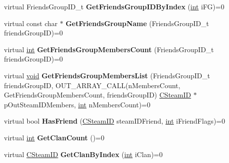 \begin{DoxyCompactItemize}
\item 
\hypertarget{classISteamFriends_a1a6e422dac40f8f15242a6a45c752d2f}{}virtual Friends\+Group\+I\+D\+\_\+t {\bfseries Get\+Friends\+Group\+I\+D\+By\+Index} (\hyperlink{SDL__thread_8h_a6a64f9be4433e4de6e2f2f548cf3c08e}{int} i\+F\+G)=0\label{classISteamFriends_a1a6e422dac40f8f15242a6a45c752d2f}

\item 
\hypertarget{classISteamFriends_a54c2657d4d5e27f47069e64aaeda2f53}{}virtual const char $\ast$ {\bfseries Get\+Friends\+Group\+Name} (Friends\+Group\+I\+D\+\_\+t friends\+Group\+I\+D)=0\label{classISteamFriends_a54c2657d4d5e27f47069e64aaeda2f53}

\item 
\hypertarget{classISteamFriends_a6fe9e93a63c5d8007eec7c65482ad397}{}virtual \hyperlink{SDL__thread_8h_a6a64f9be4433e4de6e2f2f548cf3c08e}{int} {\bfseries Get\+Friends\+Group\+Members\+Count} (Friends\+Group\+I\+D\+\_\+t friends\+Group\+I\+D)=0\label{classISteamFriends_a6fe9e93a63c5d8007eec7c65482ad397}

\item 
\hypertarget{classISteamFriends_af941cfe1efee3d4ddd639fa65d640a4d}{}virtual \hyperlink{SDL__audio_8h_a52835ae37c4bb905b903cbaf5d04b05f}{void} {\bfseries Get\+Friends\+Group\+Members\+List} (Friends\+Group\+I\+D\+\_\+t friends\+Group\+I\+D, O\+U\+T\+\_\+\+A\+R\+R\+A\+Y\+\_\+\+C\+A\+L\+L(n\+Members\+Count, Get\+Friends\+Group\+Members\+Count, friends\+Group\+I\+D) \hyperlink{classCSteamID}{C\+Steam\+I\+D} $\ast$p\+Out\+Steam\+I\+D\+Members, \hyperlink{SDL__thread_8h_a6a64f9be4433e4de6e2f2f548cf3c08e}{int} n\+Members\+Count)=0\label{classISteamFriends_af941cfe1efee3d4ddd639fa65d640a4d}

\item 
\hypertarget{classISteamFriends_a5eea1d17e8fd797dcee6920b61761e1c}{}virtual bool {\bfseries Has\+Friend} (\hyperlink{classCSteamID}{C\+Steam\+I\+D} steam\+I\+D\+Friend, \hyperlink{SDL__thread_8h_a6a64f9be4433e4de6e2f2f548cf3c08e}{int} i\+Friend\+Flags)=0\label{classISteamFriends_a5eea1d17e8fd797dcee6920b61761e1c}

\item 
\hypertarget{classISteamFriends_ad4bca073b32157360056818bf2bb8da7}{}virtual \hyperlink{SDL__thread_8h_a6a64f9be4433e4de6e2f2f548cf3c08e}{int} {\bfseries Get\+Clan\+Count} ()=0\label{classISteamFriends_ad4bca073b32157360056818bf2bb8da7}

\item 
\hypertarget{classISteamFriends_a7be8e489ca359b4e9c665f62de5de6e3}{}virtual \hyperlink{classCSteamID}{C\+Steam\+I\+D} {\bfseries Get\+Clan\+By\+Index} (\hyperlink{SDL__thread_8h_a6a64f9be4433e4de6e2f2f548cf3c08e}{int} i\+Clan)=0\label{classISteamFriends_a7be8e489ca359b4e9c665f62de5de6e3}


\end{DoxyCompactItemize}
